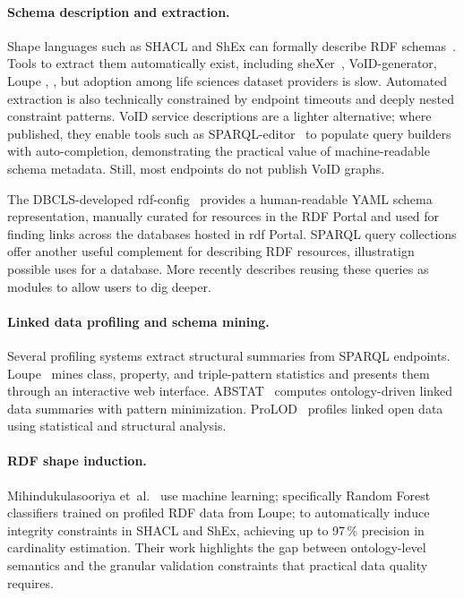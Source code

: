\documentclass[12pt]{article}
\begin{document}
\paragraph*{Schema description and extraction.}
Shape languages such as SHACL and ShEx can formally describe RDF
schemas~\cite{ahmetaj_common_2025,mihindukulasooriya_rdf_2018}.
Tools to extract them automatically exist, including
sheXer~\cite{shexer}, VoID-generator\cite{bolleman_void-generator_2015}, Loupe \cite{loupe}, \cite{kamdar_empirical_2021}, but adoption among life sciences
dataset providers is slow.
Automated extraction is also technically constrained by endpoint
timeouts and deeply nested constraint patterns.
VoID service descriptions are a lighter alternative; where published,
they enable tools such as SPARQL-editor~\cite{emonet_sparqleditor} to
populate query builders with auto-completion, demonstrating the
practical value of machine-readable schema metadata.
Still, most endpoints do not publish VoID graphs.

The DBCLS-developed rdf-config~\cite{kawashima_nbdc_2018} provides a
human-readable YAML schema representation, manually curated for
resources in the RDF Portal and used for finding links across the databases hosted 
in rdf Portal. SPARQL query collections offer another useful complement for describing
RDF resources, illustratign possible uses for a database. More recently \cite{tirlet_modular_nodate} describes
reusing these queries as modules to allow users to dig deeper. %

\paragraph*{Linked data profiling and schema mining.}
Several profiling systems extract structural summaries from SPARQL
endpoints.
Loupe~\cite{loupe2015} mines class, property, and triple-pattern
statistics and presents them through an interactive web interface.
ABSTAT~\cite{abstat2016} computes ontology-driven linked data summaries
with pattern minimization.
ProLOD~\cite{prolod2010} profiles linked open data using statistical
and structural analysis.

\paragraph*{RDF shape induction.}
Mihindukulasooriya et~al.~\cite{mihindukulasooriya_rdf_2018} use machine
learning; specifically Random Forest classifiers trained on profiled
RDF data from Loupe; to automatically induce integrity constraints in
SHACL and ShEx, achieving up to 97\,\% precision in cardinality
estimation.
Their work highlights the gap between ontology-level semantics and the
granular validation constraints that practical data quality requires.
\end{document}

